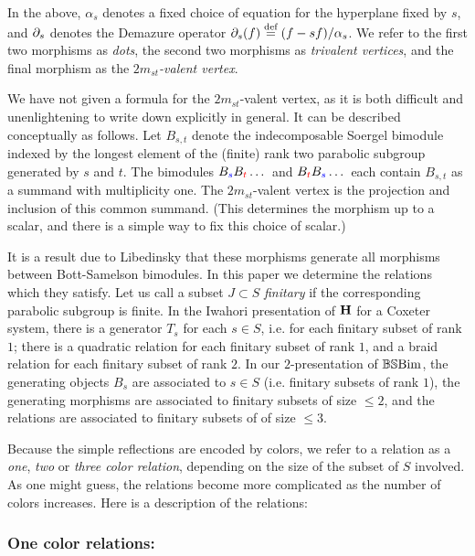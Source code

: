 In the above, $\alpha_s$ denotes a fixed choice of equation for the hyperplane fixed by $s$, and $\partial_s$ denotes the Demazure operator $\partial_s(f) \stackrel{\mbox{\scriptsize{def}}}{=} (f - sf)/\alpha_s$. We refer to the first two morphisms as \emph{dots}, the second two morphisms as \emph{trivalent vertices}, and the final morphism as the \emph{$2m_{st}$-valent vertex}.

We have not given a formula for the $2m_{st}$-valent vertex, as it is both difficult and unenlightening to write down explicitly in general. It can be described conceptually as follows. Let $B_{s,t}$ denote the indecomposable Soergel bimodule indexed by the longest element of the (finite) rank two parabolic subgroup generated by $s$ and $t$.  The bimodules $B_{\color{blue}s}B_{\color{red}t} \dots $ and $B_{\color{red}t} B_{\color{blue}s} \dots $ each contain $B_{s,t}$ as a summand with multiplicity one. The $2m_{st}$-valent vertex is the projection and inclusion of this common summand. (This determines the morphism up to a scalar, and there is a simple way to fix this choice of scalar.)

It is a result due to Libedinsky \cite{Lib} that these morphisms generate all morphisms between Bott-Samelson bimodules. In this paper we determine the relations which they satisfy. Let us
call a subset $J \subset S$ \emph{finitary} if the corresponding parabolic subgroup is finite. In the Iwahori presentation of ${\mathbf H}$ for a Coxeter system, there is a generator
$T_s$ for each $s \in S$, i.e. for each finitary subset of rank $1$; there is a quadratic relation for each finitary subset of rank $1$, and a braid relation for each finitary subset of
rank $2$. In our $2$-presentation of $\mathbb{BS}\textrm{Bim}$, the generating objects $B_s$ are associated to $s \in S$ (i.e. finitary subsets of rank $1$), the generating morphisms are associated to
finitary subsets of size $\le 2$, and the relations are associated to finitary subsets of of size $\le 3$.

Because the simple reflections are encoded by colors, we refer to a relation as
a \emph{one}, \emph{two} or \emph{three color relation}, depending on the size of the subset of $S$ involved. As one might guess, the relations become more complicated as the number of
colors increases. Here is a description of the relations:

\subsubsection{One color relations:} 

